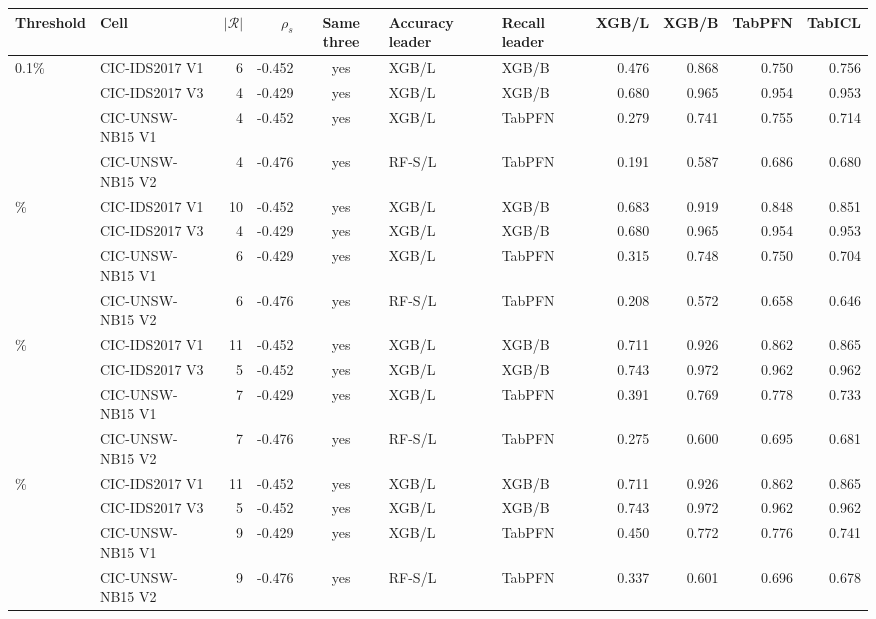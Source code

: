 \begin{tabular}{@{}llrrcllrrrr@{}}
\toprule
Threshold & Cell & $|\mathcal R|$ & $\rho_s$ & Same three & Accuracy leader & Recall leader & XGB/L & XGB/B & TabPFN & TabICL \\
\midrule
0.1\% & CIC-IDS2017 V1 & 6 & -0.452 & yes & XGB/L & XGB/B & 0.476 & 0.868 & 0.750 & 0.756 \\
 & CIC-IDS2017 V3 & 4 & -0.429 & yes & XGB/L & XGB/B & 0.680 & 0.965 & 0.954 & 0.953 \\
 & CIC-UNSW-NB15 V1 & 4 & -0.452 & yes & XGB/L & TabPFN & 0.279 & 0.741 & 0.755 & 0.714 \\
 & CIC-UNSW-NB15 V2 & 4 & -0.476 & yes & RF-S/L & TabPFN & 0.191 & 0.587 & 0.686 & 0.680 \\
\addlinespace
0.25\% & CIC-IDS2017 V1 & 10 & -0.452 & yes & XGB/L & XGB/B & 0.683 & 0.919 & 0.848 & 0.851 \\
 & CIC-IDS2017 V3 & 4 & -0.429 & yes & XGB/L & XGB/B & 0.680 & 0.965 & 0.954 & 0.953 \\
 & CIC-UNSW-NB15 V1 & 6 & -0.429 & yes & XGB/L & TabPFN & 0.315 & 0.748 & 0.750 & 0.704 \\
 & CIC-UNSW-NB15 V2 & 6 & -0.476 & yes & RF-S/L & TabPFN & 0.208 & 0.572 & 0.658 & 0.646 \\
\addlinespace
0.5\% & CIC-IDS2017 V1 & 11 & -0.452 & yes & XGB/L & XGB/B & 0.711 & 0.926 & 0.862 & 0.865 \\
 & CIC-IDS2017 V3 & 5 & -0.452 & yes & XGB/L & XGB/B & 0.743 & 0.972 & 0.962 & 0.962 \\
 & CIC-UNSW-NB15 V1 & 7 & -0.429 & yes & XGB/L & TabPFN & 0.391 & 0.769 & 0.778 & 0.733 \\
 & CIC-UNSW-NB15 V2 & 7 & -0.476 & yes & RF-S/L & TabPFN & 0.275 & 0.600 & 0.695 & 0.681 \\
\addlinespace
1\% & CIC-IDS2017 V1 & 11 & -0.452 & yes & XGB/L & XGB/B & 0.711 & 0.926 & 0.862 & 0.865 \\
 & CIC-IDS2017 V3 & 5 & -0.452 & yes & XGB/L & XGB/B & 0.743 & 0.972 & 0.962 & 0.962 \\
 & CIC-UNSW-NB15 V1 & 9 & -0.429 & yes & XGB/L & TabPFN & 0.450 & 0.772 & 0.776 & 0.741 \\
 & CIC-UNSW-NB15 V2 & 9 & -0.476 & yes & RF-S/L & TabPFN & 0.337 & 0.601 & 0.696 & 0.678 \\
\bottomrule
\end{tabular}
